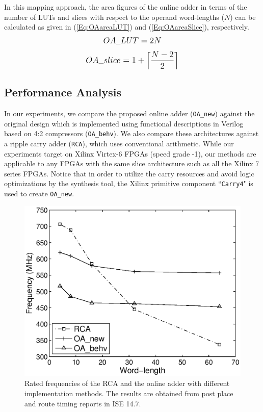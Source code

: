 \documentclass[conference]{IEEEtran}
\begin{document}
In this mapping approach, the area figures of the online adder in terms of the number of LUTs and slices with respect to the operand word-lengths ($N$) can be calculated as given in (\ref{Eq:OAareaLUT}) and (\ref{Eq:OAareaSlice}), respectively.\vspace{-0.5ex}
%
\begin{eqnarray}\label{Eq:OAareaLUT}
\scriptsize
	OA\_LUT = 2N
\normalsize
\vspace{-0.5ex}
\end{eqnarray}
%
\begin{eqnarray}\label{Eq:OAareaSlice}
\footnotesize
	OA\_slice = 1+\left\lceil\frac{N-2}{2}\right\rceil
\normalsize
\end{eqnarray}

\subsection{Performance Analysis}\label{subsec:OA_Performance}\vspace{-0.5ex}
In our experiments, we compare the proposed online adder (\texttt{OA\_new}) against the original design which is implemented using functional descriptions in Verilog based on 4:2 compressors (\texttt{OA\_behv}).  We also compare these architectures against a ripple carry adder (\texttt{RCA}), which uses conventional arithmetic. While our experiments target on Xilinx Virtex-6 FPGAs (speed grade -1), our methods are applicable to any FPGAs with the same slice architecture such as all the Xilinx 7 series FPGAs. Notice that in order to utilize the carry resources and avoid logic optimizations by the synthesis tool, the Xilinx primitive component ``\texttt{Carry4}" is used to create \texttt{OA\_new}.\vspace{-0.5ex}

\begin{figure}[tbp]
	\centering
	\includegraphics[width=.45\textwidth]{./Figures/Exp/Adder_Freq.eps}
  \vspace{-1ex}
	\caption{Rated frequencies of the RCA and the online adder with different implementation methods. The results are obtained from post place and route timing reports in ISE 14.7.}
	\label{Fig:AdderFreq}
	\vspace{-3ex}
\end{figure}
\end{document}
